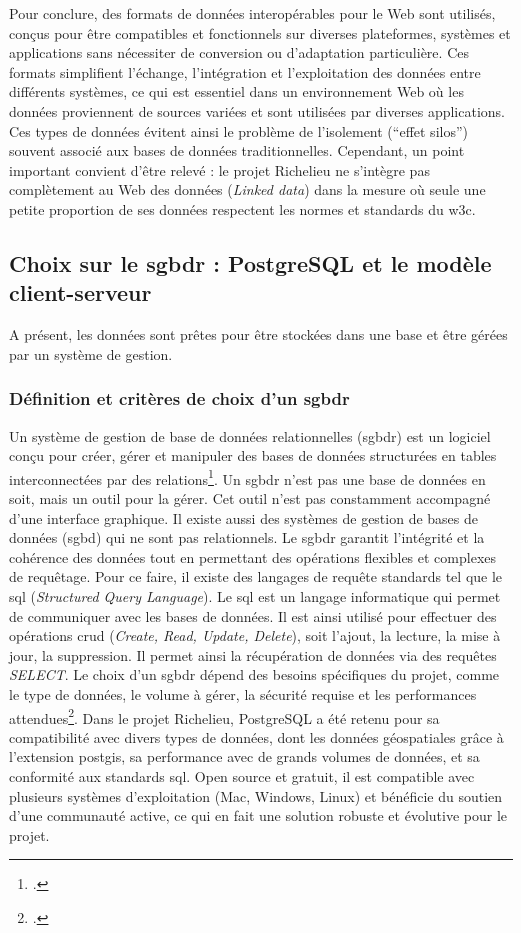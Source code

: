 Pour conclure, des formats de données interopérables pour le Web sont utilisés, conçus pour être compatibles et fonctionnels sur diverses plateformes, systèmes et applications sans nécessiter de conversion ou d’adaptation particulière. Ces formats simplifient l'échange, l'intégration et l'exploitation des données entre différents systèmes, ce qui est essentiel dans un environnement Web où les données proviennent de sources variées et sont utilisées par diverses applications. Ces types de données évitent ainsi le problème de l'isolement (\enquote{effet silos}) souvent associé aux bases de données traditionnelles. Cependant, un point important convient d'être relevé : le projet Richelieu ne s'intègre pas complètement au Web des données (\textit{Linked data}) dans la mesure où seule une petite proportion de ses données respectent les normes et standards du \acrshort{w3c}. 

\subsection{Choix sur le \acrshort{sgbdr} : PostgreSQL et le modèle client-serveur}
A présent, les données sont prêtes pour être stockées dans une base et être gérées par un système de gestion.
\subsubsection{Définition et critères de choix d'un \acrshort{sgbdr}}
Un système de gestion de base de données relationnelles (\acrshort{sgbdr}) est un logiciel conçu pour créer, gérer et manipuler des bases de données structurées en tables interconnectées par des relations\footcite{HAINAUTBases2022}. Un \acrshort{sgbdr} n’est pas une base de données en soit, mais un outil pour la gérer. Cet outil n'est pas constamment accompagné d'une interface graphique. Il existe aussi des systèmes de gestion de bases de données (\acrshort{sgbd}) qui ne sont pas relationnels. Le \acrshort{sgbdr} garantit l’intégrité et la cohérence des données tout en permettant des opérations flexibles et complexes de requêtage. Pour ce faire, il existe des langages de requête standards tel que le \acrshort{sql} (\textit{Structured Query Language}). Le \acrshort{sql} est un langage informatique qui permet de communiquer avec les bases de données. Il est ainsi utilisé pour effectuer des opérations \acrshort{crud} (\textit{Create, Read, Update, Delete}), soit l'ajout, la lecture, la mise à jour, la suppression. Il permet ainsi la récupération de données via des requêtes \textit{SELECT}. Le choix d'un \acrshort{sgbdr} dépend des besoins spécifiques du projet, comme le type de données, le volume à gérer, la sécurité requise et les performances attendues\footcite{HAINAUTBases2022}. Dans le projet Richelieu, PostgreSQL a été retenu pour sa compatibilité avec divers types de données, dont les données géospatiales grâce à l'extension \acrshort{postgis}, sa performance avec de grands volumes de données, et sa conformité aux standards \acrshort{sql}. Open source et gratuit, il est compatible avec plusieurs systèmes d'exploitation (Mac, Windows, Linux) et bénéficie du soutien d'une communauté active, ce qui en fait une solution robuste et évolutive pour le projet. 

